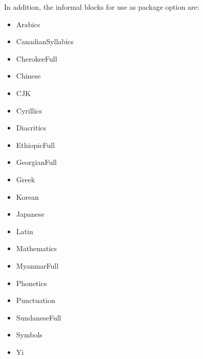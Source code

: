 ﻿\documentclass{article}
\newenvironment{itemlist}{%
  \begin{itemize}
	\setlength{\itemsep}{0pt}
	\setlength{\parsep}{0pt}
	\setlength{\topsep}{0pt}
	\setlength{\partopsep}{0pt}
	\setlength{\parskip}{0pt}
	\setlength{\labelsep}{5pt}}%
{
  \end{itemize}}
\begin{document}
		In addition, the informal blocks for use as package option are:

		\begin{itemlist}
			\item Arabics
			\item CanadianSyllabics
			\item CherokeeFull
			\item Chinese
			\item CJK
			\item Cyrillics
			\item Diacritics
			\item EthiopicFull
			\item GeorgianFull
			\item Greek
			\item Korean
			\item Japanese
			\item Latin
			\item Mathematics
			\item MyanmarFull
			\item Phonetics
			\item Punctuation
			\item SundaneseFull
			\item Symbols
			\item Yi
		\end{itemlist}
\end{document}
